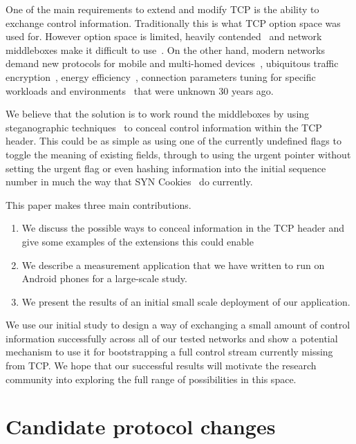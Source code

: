 \documentclass{sig-alternate-10pt}
\begin{document}
One of the main requirements to extend and modify TCP is the ability to exchange control information. Traditionally this is what TCP option space was used for. However option space is limited, heavily contended~\cite{Handley:vj,Mazieres:uz} and network middleboxes make it difficult to use~\cite{Honda,Guha2005tb,UntoldMiddlebox2011}. On the other hand, modern networks demand new protocols for mobile and multi-homed devices~\cite{Mazieres:uz}, ubiquitous traffic encryption~\cite{Handley:vj,Rescorla:R080FoGB}, energy efficiency~\cite{Aucinas:2013uk}, connection parameters tuning for specific workloads and environments~\cite{Dukkipati:2010hs,Erman:2013uz} that were unknown 30 years ago.

We believe that the solution is to work round the middleboxes by using steganographic techniques~\cite{Frczek:2012dl,Zielinska:2014fn,Rowland:1997vq,Murdoch:2005fz} to conceal control information within the TCP header. This could be as simple as using one of the currently undefined flags to toggle the meaning of existing fields, through to using the urgent pointer without setting the urgent flag or even hashing information into the initial sequence number in much the way that SYN Cookies~\cite{Eddy:2007to} do currently.

This paper makes three main contributions. 
\begin{enumerate}
\item We discuss the possible ways to conceal information in the TCP header and give some examples of the extensions this could enable
\item We describe a measurement application that we have written to run on Android phones for a large-scale study.  
\item We present the results of an initial small scale deployment of our application.
\end{enumerate}

We use our initial study to design a way of exchanging a small amount of control information successfully across all of our tested networks and show a potential mechanism to use it for bootstrapping a full control stream currently missing from TCP. We hope that our successful results will motivate the research community into exploring the full range of possibilities in this space.

\section{Candidate protocol changes}
\label{sec:protocolChanges}
\end{document}

